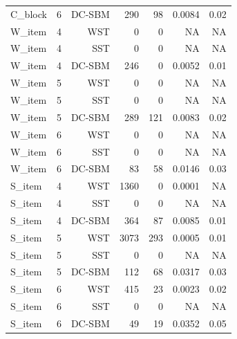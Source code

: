 \begin{table}[!h]
\begin{tabular}[t]{lrrrrrr}
C_block & 6 & DC-SBM & 290 & 98 & 0.0084 & 0.02\\
W_item & 4 & WST & 0 & 0 & NA & NA\\
W_item & 4 & SST & 0 & 0 & NA & NA\\
W_item & 4 & DC-SBM & 246 & 0 & 0.0052 & 0.01\\
W_item & 5 & WST & 0 & 0 & NA & NA\\
W_item & 5 & SST & 0 & 0 & NA & NA\\
W_item & 5 & DC-SBM & 289 & 121 & 0.0083 & 0.02\\
W_item & 6 & WST & 0 & 0 & NA & NA\\
W_item & 6 & SST & 0 & 0 & NA & NA\\
W_item & 6 & DC-SBM & 83 & 58 & 0.0146 & 0.03\\
S_item & 4 & WST & 1360 & 0 & 0.0001 & NA\\
S_item & 4 & SST & 0 & 0 & NA & NA\\
S_item & 4 & DC-SBM & 364 & 87 & 0.0085 & 0.01\\
S_item & 5 & WST & 3073 & 293 & 0.0005 & 0.01\\
S_item & 5 & SST & 0 & 0 & NA & NA\\
S_item & 5 & DC-SBM & 112 & 68 & 0.0317 & 0.03\\
S_item & 6 & WST & 415 & 23 & 0.0023 & 0.02\\
S_item & 6 & SST & 0 & 0 & NA & NA\\
S_item & 6 & DC-SBM & 49 & 19 & 0.0352 & 0.05\\
\bottomrule
\end{tabular}
\end{table}
